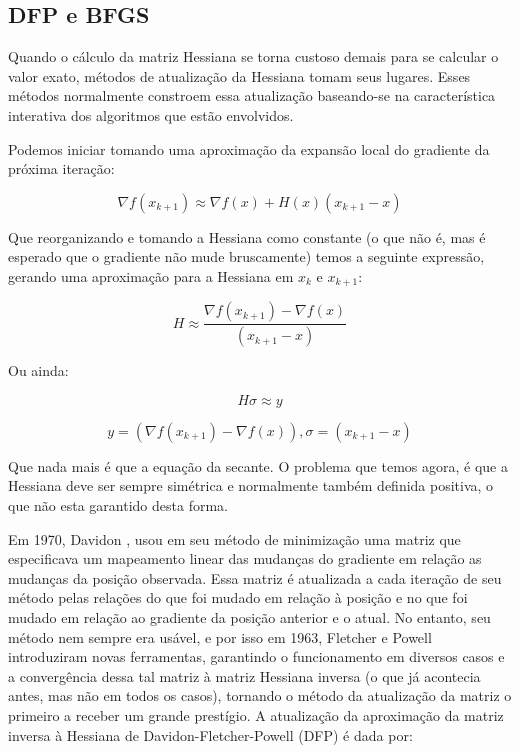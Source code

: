 \subsection{DFP e BFGS}
\label{sec_bfgs}
Quando o cálculo da matriz Hessiana se torna custoso demais para se calcular o valor exato,
métodos de atualização da Hessiana tomam seus lugares. Esses métodos normalmente constroem
essa atualização baseando-se na característica interativa dos algoritmos que estão envolvidos.

Podemos iniciar tomando uma aproximação da expansão local do gradiente da próxima iteração:

\begin{equation}
\nabla f(x_{k+1}) \approx \nabla f(x) + H(x) (x_{k+1} - x)
\end{equation}

Que reorganizando e tomando a Hessiana como constante (o que não é, mas é esperado que o gradiente
não mude bruscamente) temos a seguinte expressão, gerando uma aproximação para a Hessiana em \(x_k\)
e \(x_{k+1}\):

\begin{equation}
H \approx \frac{\nabla f(x_{k+1}) - \nabla f(x)}{(x_{k+1} - x)}
\end{equation}

Ou ainda:

\begin{equation}
H\sigma \approx y
\end{equation}

\begin{equation}
y = (\nabla f(x_{k+1}) - \nabla f(x)), \sigma = (x_{k+1} - x)
\end{equation}


Que nada mais é que a equação da secante. O problema que temos agora, é que a Hessiana deve ser
sempre simétrica e normalmente também definida positiva, o que não esta garantido desta forma.

Em 1970, Davidon \cite{davidon1991variable}, usou em seu método de minimização uma matriz que
especificava um mapeamento linear das mudanças do gradiente em relação as mudanças da posição
observada. Essa matriz é atualizada a cada iteração de seu método pelas relações do que foi
mudado em relação à posição e no que foi mudado em relação ao gradiente da posição anterior
e o atual. No entanto, seu método nem sempre era usável, e por isso em 1963, Fletcher e Powell
\cite{fletcher1963rapidly} introduziram novas ferramentas, garantindo o funcionamento em diversos
casos e a convergência dessa tal matriz à matriz Hessiana inversa (o que já acontecia antes, mas
não em todos os casos), tornando o método da atualização da matriz o primeiro a receber um grande
prestígio. A atualização da aproximação da matriz inversa à Hessiana de Davidon-Fletcher-Powell
(DFP) é dada por:

